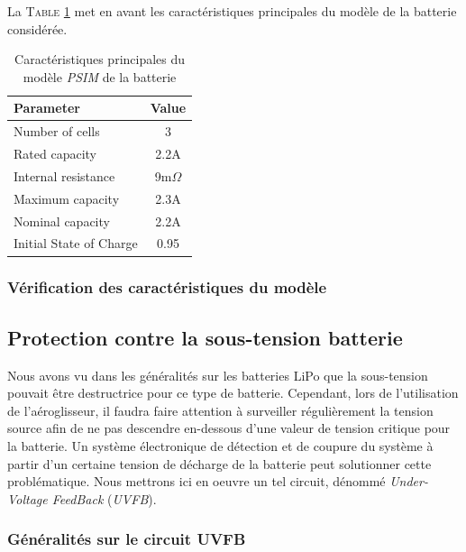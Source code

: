 \documentclass[a4paper,12pt]{book}
\begin{document}
				La \textsc{Table \ref{carac_lipo_psim}}  met en avant les caractéristiques principales du modèle de la batterie considérée.
			
				\begin{table}[h]
					\begin{center}
						\begin{tabular}{l c}
							Parameter				& Value			\\
							\hline
							Number of cells 		& 3 			\\
							Rated capacity			& 2.2A 			\\
							Internal resistance		& 9m$\Omega$	\\
							Maximum capacity		& 2.3A			\\
							Nominal capacity		& 2.2A			\\
							Initial State of Charge	& 0.95			\\
						\end{tabular}
					\end{center}
					\caption{Caractéristiques principales du modèle \textit{PSIM} de la batterie}
					\label{carac_lipo_psim}
				\end{table}
			
				\subsubsection{Vérification des caractéristiques du modèle}
			
			\subsection{Protection contre la sous-tension batterie}
			
			Nous avons vu dans les généralités sur les batteries LiPo que la sous-tension pouvait être destructrice pour ce type de batterie. Cependant, lors de l'utilisation de l'aéroglisseur, il faudra faire attention à surveiller régulièrement la tension source afin de ne pas descendre en-dessous d'une valeur de tension critique pour la batterie. Un système électronique de détection et de coupure du système à partir d'un certaine tension de décharge de la batterie peut solutionner cette problématique. Nous mettrons ici en oeuvre un tel circuit, dénommé \textit{Under-Voltage FeedBack} (\textit{UVFB}).
			
				\subsubsection{Généralités sur le circuit UVFB}
				
\end{document}
